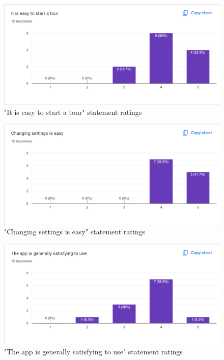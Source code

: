 \documentclass[12pt, titlepage]{article}
\begin{document}
\begin{figure}[htbp]
  \caption{"It is easy to start a tour" statement ratings}
  \centerline{\includegraphics[scale=0.35]{./Images/Q4.png}}
  \label{fig:RealWorld}
\end{figure}

\begin{figure}[htbp]
  \caption{"Changing settings is easy" statement ratings}
  \centerline{\includegraphics[scale=0.35]{./Images/Q5.png}}
  \label{fig:Fun}
\end{figure}

\begin{figure}[htbp]
  \caption{"The app is generally satisfying to use" statement ratings}
  \centerline{\includegraphics[scale=0.35]{./Images/Q6.png}}
  \label{fig:Social}
\end{figure}
\end{document}
